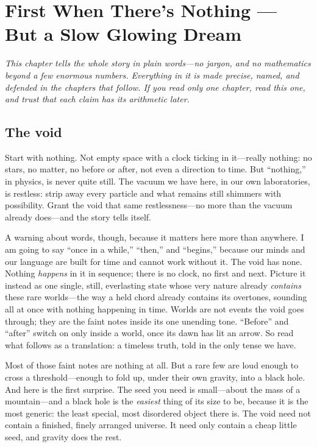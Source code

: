 \chapter{First When There's Nothing --- But a Slow Glowing Dream}
\label{chap:overture}

\noindent\emph{This chapter tells the whole story in plain words---no jargon, and
no mathematics beyond a few enormous numbers. Everything in it is made precise,
named, and defended in the chapters that follow. If you read only one chapter,
read this one, and trust that each claim has its arithmetic later.}

\section*{The void}

Start with nothing. Not empty space with a clock ticking in it---really nothing:
no stars, no matter, no before or after, not even a direction to time. But
``nothing,'' in physics, is never quite still. The vacuum we have here, in our own
laboratories, is restless: strip away every particle and what remains still
shimmers with possibility. Grant the void that same restlessness---no more than
the vacuum already does---and the story tells itself.

A warning about words, though, because it matters here more than anywhere. I am
going to say ``once in a while,'' ``then,'' and ``begins,'' because our minds and
our language are built for time and cannot work without it. The void has none.
Nothing \emph{happens} in it in sequence; there is no clock, no first and next.
Picture it instead as one single, still, everlasting state whose very nature
already \emph{contains} these rare worlds---the way a held chord already contains
its overtones, sounding all at once with nothing happening in time. Worlds are not
events the void goes through; they are the faint notes inside its one unending
tone. ``Before'' and ``after'' switch on only inside a world, once its dawn has
lit an arrow. So read what follows as a translation: a timeless truth, told in the
only tense we have.

Most of those faint notes are nothing at all. But a rare few are loud enough to
cross a threshold---enough to fold up, under their own gravity, into a black hole.
And here is the first surprise. The seed you need is small---about the mass of a
mountain---and a black hole is the \emph{easiest} thing of its size to be, because
it is the most generic: the least special, most disordered object there is. The
void need not contain a finished, finely arranged universe. It need only contain a
cheap little seed, and gravity does the rest.

